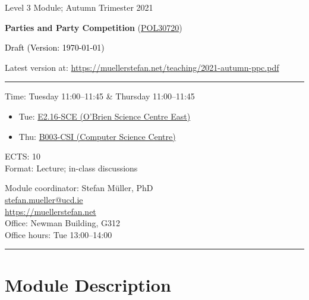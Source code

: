 \documentclass[abstract=on,parskip=full,headings=standardclasses,fontsize=11pt,paper=a4]{scrartcl}
\begin{document}
\singlespacing
\vspace{1cm}

\begin{center}
{\large Level 3 Module; 
Autumn Trimester 2021} \\ 
\bigskip

{\Large \textbf{Parties and Party Competition} (\href{https://hub.ucd.ie/usis/!W_HU_MENU.P_PUBLISH?p_tag=MODULE&MODULE=POL30720}{POL30720})} 
\bigskip


{\large  \textcolor{black}{Draft (Version: \today)}}\\
\bigskip

Latest version at: \url{https://muellerstefan.net/teaching/2021-autumn-ppc.pdf}
\end{center}

\vspace{1.5cm}



\hrule
\medskip
\begin{minipage}[t]{0.5\textwidth}
Time: Tuesday 11:00--11:45 \& Thursday 11:00--11:45
\begin{itemize} \renewcommand\labelitemi{--} \small 
\item Tue: \href{https://goo.gl/maps/vCQP95QtKrTWGDMx7}{E2.16-SCE (O'Brien Science Centre East)}
\item Thu: \href{https://goo.gl/maps/gKF6596m1vvxFeeHA}{B003-CSI (Computer Science Centre)} 
\end{itemize}
ECTS: 10 \\
Format: Lecture; in-class discussions
\end{minipage}
\begin{minipage}[t]{0.49\textwidth}
\begin{flushright}
Module coordinator: Stefan Müller, PhD \\
 \href{mailto:stefan.mueller@ucd.ie}{\textsf{stefan.mueller@ucd.ie}} \\
 \url{https://muellerstefan.net} \\
Office:  Newman Building, G312 \\
Office hours: Tue 13:00--14:00
\end{flushright}
\end{minipage}

\medskip
\hrule 

\section*{Module Description}
\end{document}
